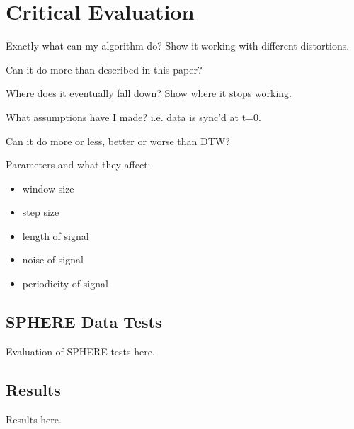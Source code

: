 \chapter{Critical Evaluation}
\label{chap:evaluation}
%
%
%

Exactly what can my algorithm do?
Show it working with different distortions.

Can it do more than described in this paper?

Where does it eventually fall down?
Show where it stops working.

What assumptions have I made? i.e. data is sync'd at t=0.

Can it do more or less, better or worse than DTW?

Parameters and what they affect:
\begin{itemize}
    \item window size
    \item step size
    \item length of signal
    \item noise of signal
    \item periodicity of signal
\end{itemize}

\section{SPHERE Data Tests}
Evaluation of SPHERE tests here.

\section{Results}
Results here.
